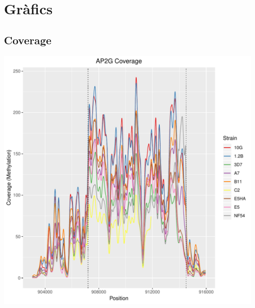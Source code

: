 \documentclass{article}\usepackage[]{graphicx}\usepackage[]{color}
\newenvironment{knitrout}{}{} %
\begin{document}
\section{Gràfics}
\subsection{Coverage}
\begin{knitrout}
\color{fgcolor}
\includegraphics[width=1\linewidth]{figure/plot_coverage-1} 

\end{knitrout}
\clearpage
\end{document}

